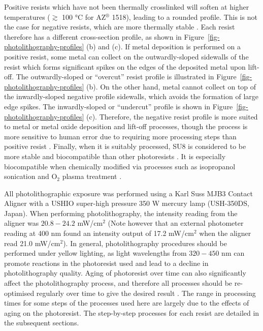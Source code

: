 \documentclass[
  a4paper,
]{scrbook}
\begin{document}
Positive resists which have not been thermally crosslinked will soften
at higher temperatures (\(\gtrsim\) 100 °C for AZ\(^\circledR\) 1518),
leading to a rounded profile. This is not the case for negative resists,
which are more thermally stable \autocite{Microchemicals1}. Each resist
therefore has a different cross-section profile, as shown in
Figure~\ref{fig-photolithography-profiles} (b) and (c). If metal
deposition is performed on a positive resist, some metal can collect on
the outwardly-sloped sidewalls of the resist which forms significant
spikes on the edges of the deposited metal upon lift-off. The
outwardly-sloped or ``overcut'' resist profile is illustrated in
Figure~\ref{fig-photolithography-profiles} (b). On the other hand, metal
cannot collect on top of the inwardly-sloped negative profile sidewalls,
which avoids the formation of large edge spikes. The inwardly-sloped or
``undercut'' profile is shown in
Figure~\ref{fig-photolithography-profiles} (c). Therefore, the negative
resist profile is more suited to metal or metal oxide deposition and
lift-off processes, though the process is more sensitive to human error
due to requiring more processing steps than positive resist
\autocite{Microchemicals1}. Finally, when it is suitably processed, SU8
is considered to be more stable and biocompatible than other
photoresists \autocite{Albarghouthi2022}. It is especially biocompatible
when chemically modified via processes such as isopropanol sonication
and O\(_2\) plasma treatment \autocite{Chen2021}.

All photolithographic exposure was performed using a Karl Suss MJB3
Contact Aligner with a USHIO super-high pressure 350 W mercury lamp
(USH-350DS, Japan). When performing photolithography, the intensity
reading from the aligner was \(20.8-24.2\) mW/cm\(^2\) (Note however
that an external photometer reading at 400 nm found an intensity output
of 17.2 mW/cm\(^2\) when the aligner read 21.0 mW/cm\(^2\)). In general,
photolithography procedures should be performed under yellow lighting,
as light wavelengths from \(320-450\) nm can promote reactions in the
photoresist used and lead to a decline in photolithography quality.
Aging of photoresist over time can also significantly affect the
photolithography process, and therefore all processes should be
re-optimised regularly over time to give the desired result
\autocite{Microchemicals1}. The range in processing times for some steps
of the processes used here are largely due to the effects of aging on
the photoresist. The step-by-step processes for each resist are detailed
in the subsequent sections.
\end{document}
